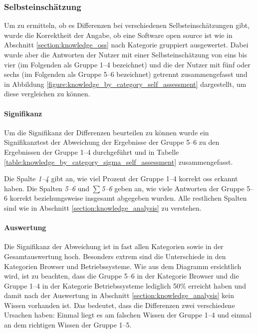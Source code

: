 \documentclass[a4paper]{article}
\begin{document}
            \subsubsection{Selbsteinschätzung}
                Um zu ermitteln, ob es Differenzen bei verschiedenen Selbsteinschätzungen gibt, wurde die Korrektheit der Angabe, ob eine Software open source ist wie in Abschnitt \ref{section:knowledge_oss} nach Kategorie gruppiert ausgewertet. Dabei wurde aber die Antworten der Nutzer mit einer Selbsteinschätzung von eins bis vier (im Folgenden als Gruppe 1--4 bezeichnet) und die der Nutzer mit fünf oder sechs (im Folgenden als Gruppe 5--6 bezeichnet) getrennt zusammengefasst und in Abbildung \ref{figure:knowledge_by_category_self_assessment} dargestellt, um diese vergleichen zu können.
                
                \paragraph{Signifikanz}
                    Um die Signifikanz der Differenzen beurteilen zu können wurde ein Signifikanztest der Abweichung der Ergebnisse der Gruppe 5--6 zu den Ergebnissen der Gruppe 1--4 durchgeführt und in Tabelle \ref{table:knowledge_by_category_sigma_self_assessment} zusammengefasst.
                    
                    Die Spalte \emph{1--4} gibt an, wie viel Prozent der Gruppe 1--4 korrekt \gls{oss} erkannt haben. Die Spalten \emph{5--6} und \emph{$\sum$5--6} geben an, wie viele Antworten der Gruppe 5--6 korrekt beziehungsweise insgesamt abgegeben wurden. Alle restlichen Spalten sind wie in Abschnitt \ref{section:knowledge_analysis} zu verstehen.
                        
                \paragraph{Auswertung}
                    Die Signifikanz der Abweichung ist in fast allen Kategorien sowie in der Gesamtauswertung hoch. Besonders extrem sind die Unterschiede in den Kategorien Browser und Betriebssysteme. Wie aus dem Diagramm ersichtlich wird, ist zu beachten, dass die Gruppe 5--6 in der Kategorie Browser und die Gruppe 1--4 in der Kategorie Betriebssysteme lediglich 50\% erreicht haben und damit nach der Auswertung in Abschnitt \ref{section:knowledge_analysis} kein Wissen vorhanden ist. Das bedeutet, dass die Differenzen zwei verschiedene Ursachen haben: Einmal liegt es am falschen Wissen der Gruppe 1--4 und einmal an dem richtigen Wissen der Gruppe 1--5.
                    
\end{document}
